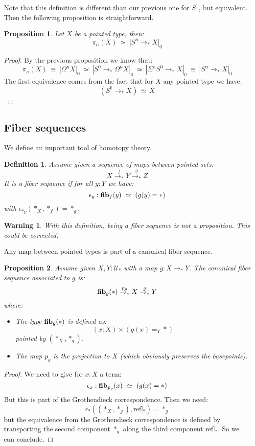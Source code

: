 \documentclass{article}
\newcommand{\sse}[1]{\medbreak \subsection{#1}}
\newcommand{\U}{{\mathcal U}}
\renewcommand{\r}{\rightarrow}
\newcommand{\refl}{\mathrm{refl}}
\newcommand{\fib}{\mathrm{\bf fib}}
\newtheorem{definition}{Definition}
\newtheorem{proposition}{Proposition}
\newtheorem{warning}{\danger Warning}
\begin{document}
Note that this definition is different than our previous one for $S^1$, but equivalent. Then the following proposition is straightforward.

\begin{proposition}
Let $X$ be a pointed type, then:
\[\pi_n(X) \ \simeq \ |S^n\r_* X|_0\]
\end{proposition}
\begin{proof}
By the previous proposition we know that:
\[\pi_n(X) \ \equiv\ |\Omega^nX|_0 \ \simeq \ |S^0\r_*\Omega^nX|_0\ \simeq\ |\Sigma^nS^0\r_*X|_0 \ \equiv\ |S^n\r_*X|_0\]
The first equivalence comes from the fact that for $X$ any pointed type we have: 
\[(S^0\r_*X)\, \simeq\, X\]
\end{proof}


\sse{Fiber sequences}

We define an important tool of homotopy theory.

\begin{definition}
Assume given a sequence of maps between pointed sets:
\[X \overset{f}{\r_*} Y\overset{g}{\r_*} Z\]
It is a fiber sequence if for all $y:Y$ we have:
\[\epsilon_y : \fib_f(y) \ \simeq\ (g(y)=*)\]
with $\epsilon_{*_Y}(*_X,*_f) = *_g$.
\end{definition}

\begin{warning}
With this definition, being a fiber sequence is not a proposition. This could be corrected. 
\end{warning}

Any map between pointed types is part of a canonical fiber sequence.

\begin{proposition}
Assume given $X,Y:\U_*$ with a map $g:X\r_* Y$. The canonical fiber sequence associated to $g$ is:
\[\fib_g(*) \overset{p_g}{\r_*} X \overset{g}{\r_*} Y\]
where:
\begin{itemize}
\item The type $\fib_g(*)$ is defined as:
\[(x:X)\times (g(x)=_Y*)\] 
pointed by $(*_X,*_g)$.
\item The map $p_g$ is the projection to $X$ (which obviously preserves the basepoints).
\end{itemize}
\end{proposition}
\begin{proof}
We need to give for $x:X$ a term: 
\[\epsilon_x : \fib_{p_g}(x)\ \simeq\ (g(x)=*)\]
But this is part of the Grothendieck correspondence. Then we need: 
\[\epsilon_*((*_X,*_g),\refl_{*}) = *_g\]
but the equivalence from the Grothendieck correspondence is defined by transporting the second component $*_g$ along the third component  $\refl_{*}$. So we can conclude.
\end{proof}
\end{document}
